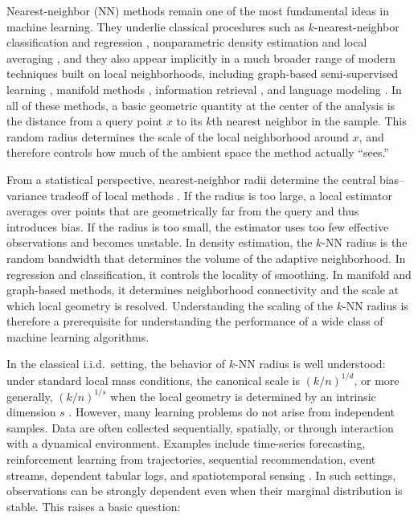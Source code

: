 \documentclass[12pt]{article}
\theoremstyle{definition}
\begin{document}
Nearest-neighbor (NN) methods remain one of the most fundamental ideas in machine learning. 
They underlie classical procedures such as $k$-nearest-neighbor classification \citep{cover1967nearest} and regression \citep{stone1977consistent}, 
nonparametric density estimation and local averaging \citep{loftsgaarden1965nonparametric}, and they also appear implicitly in a much broader range of modern techniques built on local neighborhoods, including graph-based semi-supervised learning \citep{zhu2003semi}, manifold methods \citep{belkin2003laplacian}, information retrieval \citep{wang2021comprehensive}, and language modeling \citep{khandelwal2020nearest,xu2023k, xu2023nearest}. In all of these methods, a basic geometric quantity at the center of the analysis is the distance from a query point $x$ to its $k$th nearest neighbor in the sample. This random radius determines the scale of the local neighborhood around $x$, and therefore controls how much of the ambient space the method actually ``sees.''

From a statistical perspective, nearest-neighbor radii determine the central bias--variance tradeoff of local methods \citep{stone1977consistent, biau2015lectures}. If the radius is too large, a local estimator averages over points that are geometrically far from the query and thus introduces bias. If the radius is too small, the estimator uses too few effective observations and becomes unstable. In density estimation, the $k$-NN radius is the random bandwidth that determines the volume of the adaptive neighborhood. In regression and classification, it controls the locality of smoothing. In manifold and graph-based methods, it determines neighborhood connectivity and the scale at which local geometry is resolved. Understanding the scaling of the $k$-NN radius is therefore a prerequisite for understanding the performance of a wide class of machine learning algorithms.

In the classical i.i.d.\ setting, the behavior of $k$-NN radius is well understood: under standard local mass conditions, the canonical scale is $(k/n)^{1/d}$, or more generally, $(k/n)^{1/s}$ when the local geometry is determined by an intrinsic dimension $s$ \citep{loftsgaarden1965nonparametric,biau2015lectures,kpotufe2011k}. However, many learning problems do not arise from independent samples. Data are often collected sequentially, spatially, or through interaction with a dynamical environment. Examples include time-series forecasting, reinforcement learning from trajectories, sequential recommendation, event streams, dependent tabular logs, and spatiotemporal sensing \citep{mohri2010stability,tu2024learning}. In such settings, observations can be strongly dependent even when their marginal distribution is stable. This raises a basic question:
\end{document}
